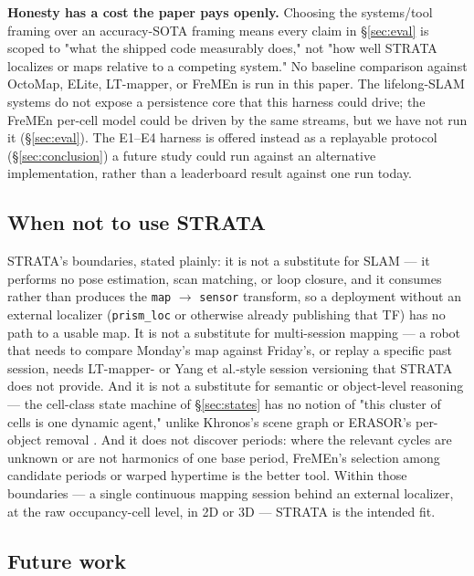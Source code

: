 \documentclass[conference]{IEEEtran}
\begin{document}
\textbf{Honesty has a cost the paper pays openly.} Choosing the systems/tool
framing over an accuracy-SOTA framing means every claim in \S\ref{sec:eval} is scoped to
"what the shipped code measurably does," not "how well STRATA localizes or
maps relative to a competing system." No baseline comparison against
OctoMap, ELite, LT-mapper, or FreMEn is run in this paper. The lifelong-SLAM
systems do not expose a persistence core that this harness could drive; the
FreMEn per-cell model could be driven by the same streams, but we have not run
it (\S\ref{sec:eval}). The E1--E4 harness is offered instead as a replayable
protocol (\S\ref{sec:conclusion}) a future study could run against an alternative
implementation, rather than a leaderboard result against one run today.

\subsection{When not to use STRATA}

STRATA's boundaries, stated plainly: it is not a substitute for SLAM --- it
performs no pose estimation, scan matching, or loop closure, and it consumes
rather than produces the \texttt{map} $\to$ \texttt{sensor} transform, so a deployment without an
external localizer (\texttt{prism\_loc} or otherwise already publishing that TF) has
no path to a usable map. It is not a substitute for multi-session mapping ---
a robot that needs to compare Monday's map against Friday's, or replay a
specific past session, needs LT-mapper- or Yang et al.-style session
versioning \cite{kim2022ltmapper,yang2025lifelong3d} that STRATA does not
provide. And it is not a substitute for semantic or object-level reasoning ---
the cell-class state machine of \S\ref{sec:states} has no notion of "this cluster of cells
is one dynamic agent," unlike Khronos's scene graph \cite{schmid2024khronos} or
ERASOR's per-object removal \cite{lim2021erasor}. And it does not discover
periods: where the relevant cycles are unknown or are not harmonics of one
base period, FreMEn's selection among candidate periods \cite{krajnik2017fremen}
or warped hypertime \cite{krajnik2019warped} is the better tool. Within those
boundaries --- a
single continuous mapping session behind an external localizer, at the raw
occupancy-cell level, in 2D or 3D --- STRATA is the intended fit.

\subsection{Future work}
\end{document}
